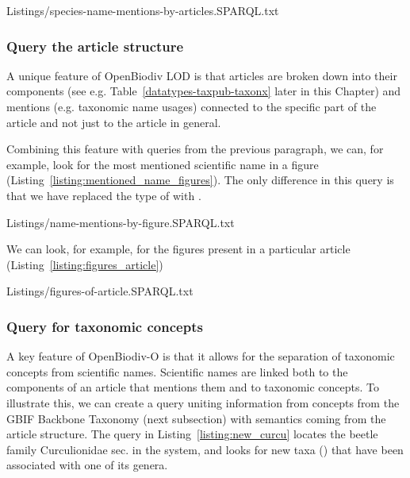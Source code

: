 




{Listings/species-name-mentions-by-articles.SPARQL.txt}

\subsubsection{Query the article structure} A unique feature of OpenBiodiv LOD is that articles are broken down into their components (see e.g. Table~\ref{datatypes-taxpub-taxonx} later in this Chapter) and mentions (e.g. taxonomic name usages) connected to the specific part of the article and not just to the article in general.

Combining this feature with queries from the previous paragraph, we can, for example, look for the most mentioned scientific name in a figure (Listing~\ref{listing:mentioned_name_figures}). The only difference in this query is that we have replaced the type of  with . 


{Listings/name-mentions-by-figure.SPARQL.txt}

We can look, for example, for the figures present in a particular article (Listing~\ref{listing:figures_article})


{Listings/figures-of-article.SPARQL.txt}

\subsubsection{Query for taxonomic concepts}

A key feature of OpenBiodiv-O is that it allows for the separation of taxonomic concepts from scientific names. Scientific names are linked both to the components of an article that mentions them and to taxonomic concepts. To illustrate this, we can create a query uniting information from concepts from the GBIF Backbone Taxonomy (next subsection) with semantics coming from the article structure. The query in Listing~\ref{listing:new_curcu} locates the beetle family Curculionidae sec. \cite{gbif_secretariat_gbif_2017} in the system, and looks for new taxa () that have been associated with one of its genera.

